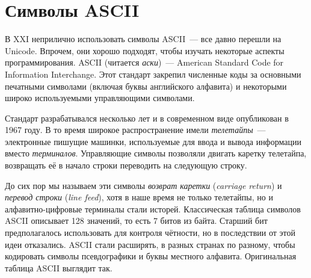 \chapter{Символы ASCII}

В XXI неприлично использовать символы ASCII~--- все давно перешли на Unicode.
Впрочем, они хорошо подходят, чтобы изучать некоторые аспекты программирования.
ASCII (читается {\em аски}) — American Standard Code for Information Interchange.
Этот стандарт закрепил численные коды за основными печатными символами (включая буквы английского алфавита) и некоторыми широко используемыми управляющими символами.

Стандарт разрабатывался несколько лет и в современном виде опубликован в 1967 году.
В то время широкое распространение имели {\em телетайпы}~--- электронные пишущие машинки, используемые для ввода и вывода информации вместо {\em терминалов}.
Управляющие символы позволяли двигать каретку телетайпа, возвращать её в начало строки переводить на следующую строку.

До сих пор мы называем эти символы {\em возврат каретки} ({\em carriage return}) и {\em перевод строки} ({\em line feed}), хотя в наше время не только телетайпы, но и алфавитно-цифровые терминалы стали исторей.
Классическая таблица символов ASCII описывает 128 значений, то есть 7 битов из байта. Старший бит предполагалось использовать для контроля чётности, но в последствии от этой идеи отказались. ASCII стали расширять, в разных странах по разному, чтобы кодировать символы псевдографики и буквы местного алфавита.
Оригинальная таблица ASCII выглядит так.


